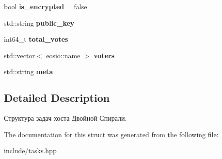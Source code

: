\begin{DoxyCompactItemize}
\item 
\mbox{\label{structtasks_a054b40e6f71e3a6e8ee5b060f110980f}} 
bool {\bfseries is\+\_\+encrypted} = false
\item 
\mbox{\label{structtasks_a0fd14a56e1f0f01da069aed7a67fff26}} 
std\+::string {\bfseries public\+\_\+key}
\item 
\mbox{\label{structtasks_a40d534d86b521f66775ed1b2d391ea38}} 
int64\+\_\+t {\bfseries total\+\_\+votes}
\item 
\mbox{\label{structtasks_a16b3de55e07255e8252fd85e26688dd3}} 
std\+::vector$<$ eosio\+::name $>$ {\bfseries voters}
\item 
\mbox{\label{structtasks_a5f7ccf26e6ac1b678d8cd6807631a19e}} 
std\+::string {\bfseries meta}
\end{DoxyCompactItemize}


\subsection{Detailed Description}
Структура задач хоста Двойной Спирали. 

The documentation for this struct was generated from the following file\+:\begin{DoxyCompactItemize}
\item 
include/tasks.\+hpp\end{DoxyCompactItemize}
